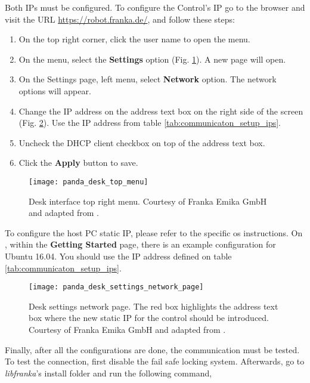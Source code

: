 Both IPs must be configured. To configure the Control's IP go to the browser and visit the URL \url{https://robot.franka.de/}, and follow these steps:

\begin{enumerate}
    \item On the top right corner, click the user name to open the menu.
    \item On the menu, select the \textbf{Settings} option (Fig. \ref{fig:panda_desk_top_menu}). A new page will open.
    \item On the Settings page, left menu, select \textbf{Network} option. The network options will appear.
    \item Change the IP address on the address text box on the right side of the screen (Fig. \ref{fig:panda_desk_settings_network_page}). Use the IP address from table \ref{tab:communicaton_setup_ips}.
    \item Uncheck the DHCP client checkbox on top of the address text box.
    \item Click the \textbf{Apply} button to save.
\end{enumerate}

\begin{figure}[htbp]
    \centering
	\texttt{[image: panda\_desk\_top\_menu]}
	\caption{Desk interface top right menu. Courtesy of Franka Emika GmbH and adapted from \cite{FrankaEmikaGmbH_fci_documentation}.}
	\label{fig:panda_desk_top_menu}
\end{figure}

To configure the host PC static IP, please refer to the specific \gls{os} instructions. On \cite{FrankaEmikaGmbH_fci_documentation}, within the \textbf{Getting Started} page, there is an example configuration for Ubuntu 16.04. You should use the IP address defined on table \ref{tab:communicaton_setup_ips}.\\

\begin{figure}[htbp]
    \centering
	\texttt{[image: panda\_desk\_settings\_network\_page]}
	\caption{Desk settings network page. The red box highlights the address text box where the new static IP for the control should be introduced. Courtesy of Franka Emika GmbH and adapted from \cite{FrankaEmikaGmbH_fci_documentation}.}
	\label{fig:panda_desk_settings_network_page}
\end{figure}

Finally, after all the configurations are done, the communication must be tested. To test the connection, first disable the fail safe locking system. Afterwards, go to \textit{libfranka}'s install folder and run the following command,


